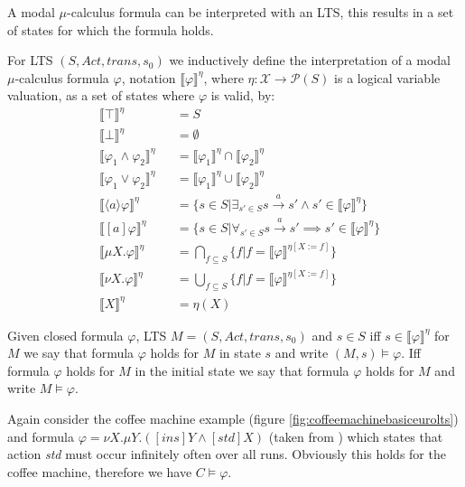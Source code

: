 A modal $\mu$-calculus formula can be interpreted with an LTS, this results in a set of states for which the formula holds.
\begin{definition}
	\label{def_mu_sem} For LTS $(S, Act, trans, s_0)$ we inductively define the interpretation of a modal $\mu$-calculus formula $\varphi$, notation
	$\llbracket \varphi \rrbracket^\eta$, where $\eta : \mathcal{X} \rightarrow \mathcal{P}(S)$ is a logical variable valuation, as a set of states
	where $\varphi$ is valid, by:
	\begin{align*}
	&\llbracket {\top} \rrbracket^\eta &&= S\\
	&\llbracket {\bot} \rrbracket^\eta &&= \emptyset\\
	&\llbracket \varphi_1 \wedge \varphi_2 \rrbracket^\eta &&= \llbracket \varphi_1 \rrbracket^\eta \cap \llbracket \varphi_2 \rrbracket^\eta \\
	&\llbracket \varphi_1 \vee \varphi_2 \rrbracket^\eta &&= \llbracket \varphi_1 \rrbracket^\eta \cup \llbracket \varphi_2 \rrbracket^\eta\\
	&\llbracket \langle a \rangle \varphi \rrbracket^\eta &&= \{s \in S|\exists_{s' \in S} s \xrightarrow {a} s' \wedge s' \in \llbracket \varphi \rrbracket^\eta\}\\
	&\llbracket [ a ] \varphi \rrbracket^\eta &&= \{s \in S|\forall_{s' \in S} s \xrightarrow {a} s' \implies s' \in \llbracket \varphi \rrbracket^\eta\}\\
	&\llbracket \mu X. \varphi \rrbracket^\eta &&= \bigcap_{f \subseteq S}\{f | f = \llbracket \varphi \rrbracket^{\eta[X:=f]}\}\\
	&\llbracket \nu X. \varphi \rrbracket^\eta &&= \bigcup_{f \subseteq S}\{f | f = \llbracket \varphi \rrbracket^{\eta[X:=f]}\}\\
	&\llbracket X \rrbracket^\eta &&= \eta(X)
	\end{align*}
\end{definition}

Given closed formula $\varphi$, LTS $M = (S, Act, trans, s_0)$ and $s \in S$ iff $s \in \llbracket \varphi \rrbracket^\eta$ for $M$ we say that formula $\varphi$ holds for $M$ in state $s$ and write $(M,s) \models \varphi$. Iff formula $\varphi$ holds for $M$ in the initial state we say that formula $\varphi$ holds for $M$ and write $M \models \varphi$.

Again consider the coffee machine example (figure \ref{fig:coffeemachinebasiceurolts}) and formula $\varphi = \nu X. \mu Y. ([ins]Y \wedge [std] X)$ (taken from \cite{FamBasedModelCheckingWithMCRL2}) which states that action \textit{std} must occur infinitely often over all runs. Obviously this holds for the coffee machine, therefore we have $C \models \varphi$.

